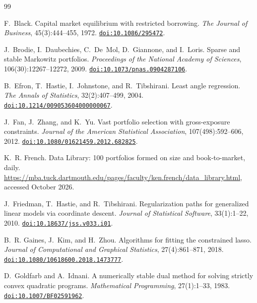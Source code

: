 \documentclass[11pt]{article}
\begin{document}
\begin{thebibliography}{99}\setlength{\itemsep}{0pt}

F.~Black.
\newblock Capital market equilibrium with restricted borrowing.
\newblock \emph{The Journal of Business}, 45(3):444--455, 1972.
\newblock \href{https://doi.org/10.1086/295472}{\texttt{doi:10.1086/295472}}.

J.~Brodie, I.~Daubechies, C.~De~Mol, D.~Giannone, and I.~Loris.
\newblock Sparse and stable {M}arkowitz portfolios.
\newblock \emph{Proceedings of the National Academy of Sciences}, 106(30):12267--12272,
2009.
\newblock \href{https://doi.org/10.1073/pnas.0904287106}{\texttt{doi:10.1073/pnas.0904287106}}.

B.~Efron, T.~Hastie, I.~Johnstone, and R.~Tibshirani.
\newblock Least angle regression.
\newblock \emph{The Annals of Statistics}, 32(2):407--499, 2004.
\newblock \href{https://doi.org/10.1214/009053604000000067}{\texttt{doi:10.1214/009053604000000067}}.

J.~Fan, J.~Zhang, and K.~Yu.
\newblock Vast portfolio selection with gross-exposure constraints.
\newblock \emph{Journal of the American Statistical Association}, 107(498):592--606,
2012.
\newblock \href{https://doi.org/10.1080/01621459.2012.682825}{\texttt{doi:10.1080/01621459.2012.682825}}.

K.~R. French.
\newblock Data Library: 100 portfolios formed on size and book-to-market, daily.
\newblock \url{https://mba.tuck.dartmouth.edu/pages/faculty/ken.french/data_library.html},
accessed October 2026.

J.~Friedman, T.~Hastie, and R.~Tibshirani.
\newblock Regularization paths for generalized linear models via coordinate descent.
\newblock \emph{Journal of Statistical Software}, 33(1):1--22, 2010.
\newblock \href{https://doi.org/10.18637/jss.v033.i01}{\texttt{doi:10.18637/jss.v033.i01}}.

B.~R. Gaines, J.~Kim, and H.~Zhou.
\newblock Algorithms for fitting the constrained lasso.
\newblock \emph{Journal of Computational and Graphical Statistics}, 27(4):861--871, 2018.
\newblock \href{https://doi.org/10.1080/10618600.2018.1473777}{\texttt{doi:10.1080/10618600.2018.1473777}}.

D.~Goldfarb and A.~Idnani.
\newblock A numerically stable dual method for solving strictly convex quadratic
programs.
\newblock \emph{Mathematical Programming}, 27(1):1--33, 1983.
\newblock \href{https://doi.org/10.1007/BF02591962}{\texttt{doi:10.1007/BF02591962}}.


\end{thebibliography}
\end{document}
